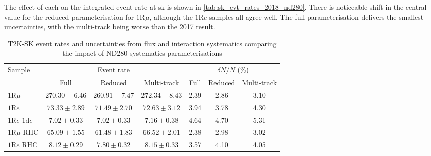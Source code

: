 The effect of each on the integrated event rate at sk is shown in \autoref{tab:sk_evt_rates_2018_nd280}. There is noticeable shift in the central value for the reduced parameterisation for $1\text{R}\mu$, although the $1\text{R}e$ samples all agree well. The full parameterisation delivers the smallest uncertainties, with the multi-track being worse than the 2017 result. 
\begin{table}
	\begin{tabular}{l | c c c | c c c }
		\hline
		\hline
		Sample  & \multicolumn{3}{c|}{Event rate} & \multicolumn{3}{c}{$\delta N/N$ (\%)} \\
				& Full & Reduced & Multi-track & Full & Reduced & Multi-track \\
		\hline
		$1\text{R}\mu$ & $270.30\pm6.46$ & $260.91\pm7.47$ & $272.34\pm8.43$ & 2.39 & 2.86 & 3.10 \\
		$1\text{R}e$  & $73.33\pm2.89$ & $71.49\pm2.70$ & $72.63\pm3.12$ & 3.94 & 3.78 & 4.30  \\
		$1\text{R}e \text{ 1d}e$ & $7.02\pm0.33$ & $7.02\pm0.33$ & $7.16\pm0.38$ & 4.64 & 4.70 & 5.31 \\
		
		$1\text{R}\mu \text{ RHC}$  & $65.09\pm1.55$ & $61.48\pm1.83$ & $66.52\pm2.01$ & 2.38 & 2.98 & 3.02 \\
		$1\text{R}e \text{ RHC}$ & $8.12\pm0.29$ & $7.80\pm0.32$ & $8.15\pm0.33$ & 3.57 & 4.10 & 4.05 \\
		\hline
		\hline
	\end{tabular}
	\caption{T2K-SK event rates and uncertainties from flux and interaction systematics comparing the impact of ND280 systematics parameterisations}
	\label{tab:sk_evt_rates_2018_nd280}
\end{table}

